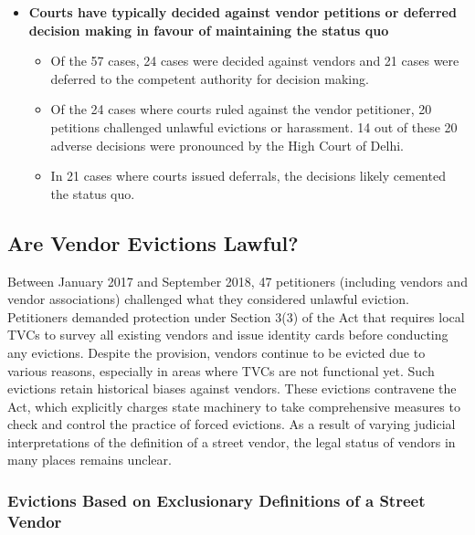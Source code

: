 \documentclass[a4paper, 12pt, twoside]{article}
\begin{document}
{\begin{itemize}
\begin{itemize}
\end{itemize}

\end{itemize}

\begin{itemize}
\item \textbf{ Courts have typically decided against vendor petitions or deferred decision making in favour of maintaining the status quo}

\begin{itemize}
\item 	Of the 57 cases, 24 cases were decided against vendors and 21 cases were deferred to the competent authority for decision making.
\item 	Of the 24 cases where courts ruled against the vendor petitioner, 20 petitions challenged unlawful evictions or harassment. 14 out of these 20 adverse decisions were pronounced by the High Court of Delhi.
\item 	In 21 cases where courts issued deferrals, the decisions likely cemented the status quo.
\end{itemize}
\end{itemize}

\subsection*{Are Vendor Evictions Lawful?}

Between January 2017 and September 2018, 47 petitioners (including vendors and vendor associations) challenged what they considered unlawful eviction. Petitioners demanded protection under Section 3(3) of the Act that requires local TVCs to survey all existing vendors and issue identity cards before conducting any evictions. Despite the provision, vendors continue to be evicted due to various reasons, especially in areas where TVCs are not functional yet. Such evictions retain historical biases against vendors. These evictions contravene the Act, which explicitly charges state machinery to take comprehensive measures to check and control the practice of forced evictions. As a result of varying judicial interpretations of the definition of a street vendor, the legal status of vendors in many places remains unclear.

\subsubsection*{Evictions Based on Exclusionary Definitions of a Street Vendor}

}
\end{document}
